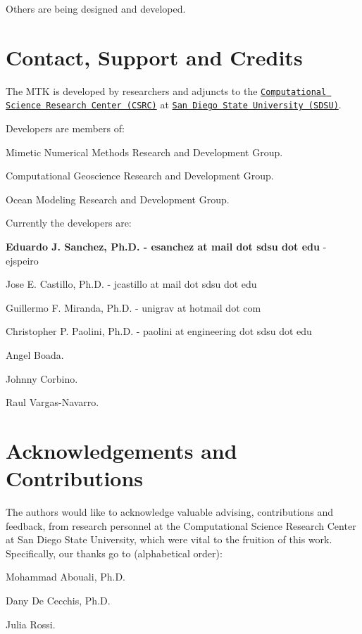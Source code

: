 Others are being designed and developed.\hypertarget{index_section_authors}{}\section{Contact, Support and Credits}\label{index_section_authors}
The M\-T\-K is developed by researchers and adjuncts to the \href{http://www.csrc.sdsu.edu/}{\tt Computational Science Research Center (C\-S\-R\-C)} at \href{http://www.sdsu.edu/}{\tt San Diego State University (S\-D\-S\-U)}.

Developers are members of\-:


\begin{DoxyEnumerate}
\item Mimetic Numerical Methods Research and Development Group.
\item Computational Geoscience Research and Development Group.
\item Ocean Modeling Research and Development Group.
\end{DoxyEnumerate}

Currently the developers are\-:


\begin{DoxyEnumerate}
\item {\bfseries Eduardo J. Sanchez, Ph.\-D. -\/ esanchez at mail dot sdsu dot edu} -\/ ejspeiro
\item Jose E. Castillo, Ph.\-D. -\/ jcastillo at mail dot sdsu dot edu
\item Guillermo F. Miranda, Ph.\-D. -\/ unigrav at hotmail dot com
\item Christopher P. Paolini, Ph.\-D. -\/ paolini at engineering dot sdsu dot edu
\item Angel Boada.
\item Johnny Corbino.
\item Raul Vargas-\/\-Navarro.
\end{DoxyEnumerate}\hypertarget{index_subsection_acknowledgements}{}\section{Acknowledgements and Contributions}\label{index_subsection_acknowledgements}
The authors would like to acknowledge valuable advising, contributions and feedback, from research personnel at the Computational Science Research Center at San Diego State University, which were vital to the fruition of this work. Specifically, our thanks go to (alphabetical order)\-:


\begin{DoxyEnumerate}
\item Mohammad Abouali, Ph.\-D.
\item Dany De Cecchis, Ph.\-D.
\item Julia Rossi. 
\end{DoxyEnumerate}